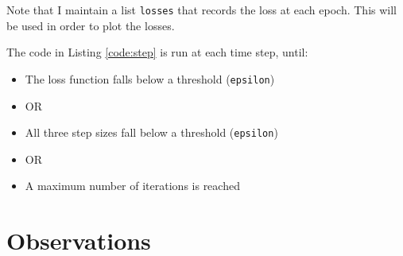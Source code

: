 \documentclass{report}
\begin{document}
Note that I maintain a list \texttt{losses} that records the loss at each epoch. This will be used in order to plot the losses.
\newline

The code in Listing \ref{code:step} is run at each time step, until:

\begin{itemize}
    \item The loss function falls below a threshold (\texttt{epsilon})
    \item[] \quad \quad \quad \quad OR
    \item All three step sizes fall below a threshold (\texttt{epsilon})
    \item[] \quad \quad \quad \quad OR
    \item A maximum number of iterations is reached
\end{itemize}

\section{Observations}
\end{document}
